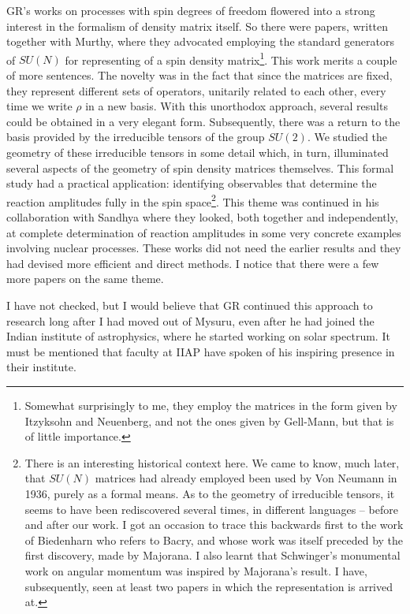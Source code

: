 GR's works on processes with spin degrees of freedom flowered into a strong interest in the formalism of density matrix itself.  So there were papers, written together with Murthy, where they advocated employing the standard generators of $SU(N)$ for representing of a spin density matrix\footnote{Somewhat surprisingly to me, they employ the matrices in the form given by Itzyksohn and Neuenberg, and not the ones given by Gell-Mann, but that is of little importance.}.  This work merits a couple of more sentences. The novelty was in the fact that since the matrices are fixed, they represent different sets of operators, unitarily related to each other, every time we write $\rho$ in a new basis.  With this unorthodox approach, several results could be obtained in a very elegant form. Subsequently, there was a return to the basis provided by the irreducible tensors of the group $SU(2)$. We studied the geometry of these irreducible tensors in some detail which, in turn, illuminated several aspects of the geometry of spin density matrices themselves. This formal study had a practical application: identifying observables that determine the reaction amplitudes fully in the spin space\footnote{There is an interesting historical context here. We came to know, much later, that $SU(N)$ matrices had already employed been used by Von Neumann in 1936, purely as a formal means. As to the geometry of irreducible tensors, it seems to have been rediscovered several times, in different languages -- before and after our work. I got an occasion to trace this backwards first to the work of Biedenharn who refers to Bacry, and whose work was itself preceded by the first discovery, made by Majorana. I also learnt that Schwinger's monumental work on angular momentum was inspired by Majorana's result. I have, subsequently, seen at least two papers in which the representation is arrived at.}. This theme was continued in his collaboration with Sandhya where they looked, both together and independently, at complete determination of reaction amplitudes in some very concrete examples involving nuclear processes. These works did not need the earlier results and they had devised more efficient and direct methods.  I notice that there were a few more papers on the same theme.

I have not checked, but I would believe that GR continued this approach to research long after I had moved out of Mysuru, even after he had joined the Indian institute of astrophysics, where he started working on solar spectrum. It must be mentioned that faculty at IIAP have spoken of his inspiring presence in their institute.

